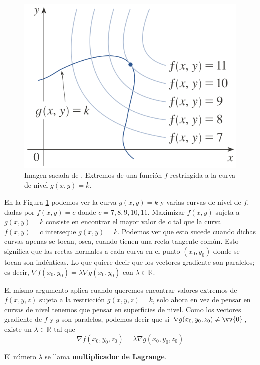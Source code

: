 \documentclass[12pt]{article}
\begin{document}
\begin{figure}[H]
  \centering
  \includegraphics[width=0.4\linewidth]{imagenes/lagrange_2_variables.png}
  \caption{Imagen sacada de \parencite{stewart2}. Extremos de una función $ f $ restringida a la curva de nivel $ g(x,y)=k $.}
  \label{fig:lagrange}
\end{figure}

En la Figura \ref{fig:lagrange} podemos ver la curva $ g(x,y)=k $ y varias curvas de nivel de $ f $, dadas por $ f(x,y)=c $ donde $ c= 7,8,9,10,11 $. Maximizar $ f(x,y) $ sujeta a $ g(x,y)=k $ consiste en encontrar el mayor valor de $ c $ tal que la curva $ f(x,y)=c $ interseque $ g(x,y)=k $. Podemos ver que esto sucede cuando dichas curvas apenas se tocan, osea, cuando tienen una recta tangente común. Esto significa que las rectas normales a cada curva en el punto $ (x_{0},y_{0}) $ donde se tocan son indénticas. Lo que quiere decir que los vectores gradiente son paralelos; es decir, $ \nabla f(x_{0},y_{0}) = \lambda \nabla g(x_{0},y_{0}) $ con $ \lambda  \in \mathbb{R}^{} $.

El mismo argumento aplica cuando queremos encontrar valores extremos de $ f(x,y,z) $ sujeta a la restricción $ g(x,y,z)=k $, solo ahora en vez de pensar en curvas de nivel tenemos que pensar en superficies de nivel. Como los vectores gradiente de $ f $ y $ g $ son paralelos, podemos decir que si $ \nabla g(x_{0},y_{0},z_{0})\neq \vv{0} $, existe un $ \lambda  \in \mathbb{R}^{} $ tal que
\[
  \nabla f(x_{0},y_{0},z_{0}) = \lambda \nabla g(x_{0},y_{0},z_{0})
\]

El número $ \lambda $ se llama \textbf{multiplicador de Lagrange}.

\vspace{0.2cm}
\vspace{0.2cm}
\end{document}
